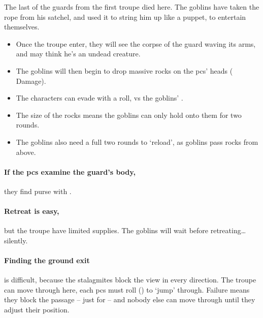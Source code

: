 \begin{multicols}{2}


\begin{exampletext}
  The last of the \glspl{guard} from the first troupe died here.
  The goblins have taken the rope from his satchel, and used it to string him up like a puppet, to entertain themselves.
\end{exampletext}

\begin{itemize}
  \item
  Once the troupe enter, they will see the corpse of the \gls{guard} waving its arms, and may think he's an undead creature.
  \item
  The goblins will then begin to drop massive rocks on the \glspl{pc}' heads ( Damage).
  \item
  The characters can evade with a  roll, vs the goblins' .
  \item
  The size of the rocks means the goblins can only hold onto them for two \glspl{round}.
  \item
  The goblins also need a full two rounds to `reload', as goblins pass rocks from above.
\end{itemize}

\paragraph{If the \glspl{pc} examine the \gls{guard}'s body,}
they find  purse with \lootMedium.
\label{caveCoinsIII}
\setcounter{diceNo}{0}%
\renewcommand\npcsymbol{\currency}

\paragraph{Retreat is easy,}
but the troupe have limited supplies.
The goblins will wait  before retreating\ldots silently.

\paragraph{Finding the ground exit}
is difficult, because the stalagmites block the view in every direction.
The troupe can move through here, each \glspl{pc} must roll  (\tn[10]) to `jump' through.
Failure means they block the passage -- just for  -- and nobody else can move through until they adjust their position.


\end{multicols}
